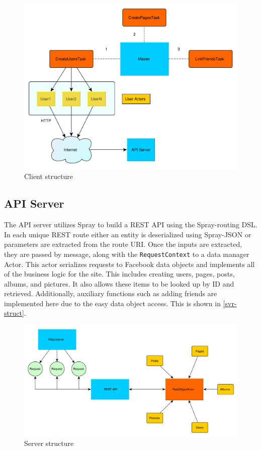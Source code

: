 \documentclass{article}
\begin{document}
\begin{figure}[H]
  \centering
  \includegraphics[scale=0.5]{diagrams/client-structure.pdf}
  \caption{Client structure}
  \label{cli-struct}
\end{figure}

\subsection*{API Server}
The API server utilizes Spray to build a REST API using the Spray-routing DSL. In each unique REST route either an entity is deserialized using Spray-JSON or parameters are extracted from the route URI. Once the inputs are extracted, they are passed by message, along with the \texttt{RequestContext} to a data manager Actor. This actor serializes requests to Facebook data objects and implements all of the business logic for the site. This includes creating users, pages, posts, albums, and pictures. It also allows these items to be looked up by ID and retrieved. Additionally, auxiliary functions such as adding friends are implemented here due to the easy data object access. This is shown in \autoref{svr-struct}.

\begin{figure}[H]
  \centering
  \includegraphics[scale=0.5]{diagrams/server-structure.pdf}
  \caption{Server structure}
  \label{svr-struct}
\end{figure}
\end{document}
